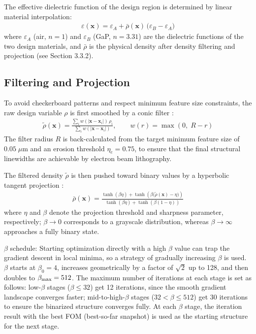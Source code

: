 The effective dielectric function of the design region is determined by linear material interpolation:
\begin{align}
\varepsilon (\mathbf{x}) = \varepsilon_{A} + \bar{\rho} (\mathbf{x})\,\bigl (\varepsilon_{B} - \varepsilon_{A}\bigr)
\end{align}
where $\varepsilon_A$ (air, $n=1$) and $\varepsilon_B$ (GaP, $n=3.31$) are the dielectric functions of the two design materials, and $\bar{\rho}$ is the physical density after density filtering and projection (see Section 3.3.2).

\subsection{Filtering and Projection}

To avoid checkerboard patterns and respect minimum feature size constraints, the raw design variable $\rho$ is first smoothed by a conic filter \cite{lazarov2011filters}:
\begin{align}
\tilde{\rho} (\mathbf{x}) = \frac{\displaystyle\sum_{i} w (|\mathbf{x}-\mathbf{x}_i|)\,\rho_i}{\displaystyle\sum_{i} w (|\mathbf{x}-\mathbf{x}_i|)}, \qquad w (r) = \max (0,\; R - r)
\end{align}
The filter radius $R$ is back-calculated from the target minimum feature size of $0.05\;\mu\text{m}$ and an erosion threshold $\eta_e = 0.75$, to ensure that the final structural linewidths are achievable by electron beam lithography.

The filtered density $\tilde{\rho}$ is then pushed toward binary values by a hyperbolic tangent projection \cite{wang2011projection}:
\begin{align}
\bar{\rho} (\mathbf{x}) = \frac{\tanh (\beta\eta) + \tanh\!\left (\beta\bigl (\tilde{\rho} (\mathbf{x})-\eta\bigr)\right)}{\tanh (\beta\eta) + \tanh\!\left (\beta (1-\eta)\right)}
\end{align}
where $\eta$ and $\beta$ denote the projection threshold and sharpness parameter, respectively; $\beta \to 0$ corresponds to a grayscale distribution, whereas $\beta \to \infty$ approaches a fully binary state.

$\beta$ schedule: Starting optimization directly with a high $\beta$ value can trap the gradient descent in local minima, so a strategy of gradually increasing $\beta$ is used. $\beta$ starts at $\beta_0 = 4$, increases geometrically by a factor of $\sqrt{2}$ up to 128, and then doubles to $\beta_{\rm max} = 512$. The maximum number of iterations at each stage is set as follows: low-$\beta$ stages ($\beta \le 32$) get 12 iterations, since the smooth gradient landscape converges faster; mid-to-high-$\beta$ stages ($32 < \beta \le 512$) get 30 iterations to ensure the binarized structure converges fully. At each $\beta$ stage, the iteration result with the best FOM (best-so-far snapshot) is used as the starting structure for the next stage.

